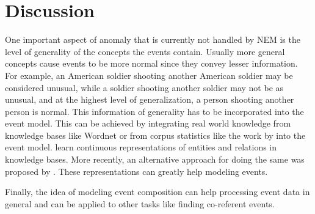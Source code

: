 \section{Discussion}
One important aspect of anomaly that is currently not handled by NEM
is the level of generality of the concepts the events contain.  Usually
more general concepts cause events to be more normal since they convey
lesser information.  For example, an American soldier shooting another American
soldier
may be considered unusual, while a soldier shooting another soldier may not be
as unusual, and at the 
highest level of generalization, a person shooting another person is normal. 
This information
of generality has to be incorporated into the event model.  This can be achieved
by integrating 
real world knowledge from knowledge bases like Wordnet \cite{miller1995wordnet}
or from corpus 
statistics like the work by \cite{lin1998automatic} into the event model.  
\cite{bordes2011learning} learn continuous representations of 
entities and relations in knowledge bases.  More recently, an alternative approach
for doing the same was proposed by \cite{chen2013learning}.  These representations
can greatly help modeling events.

Finally, the idea of modeling event composition can help processing event data
in general and can 
be applied to other tasks like finding co-referent events.